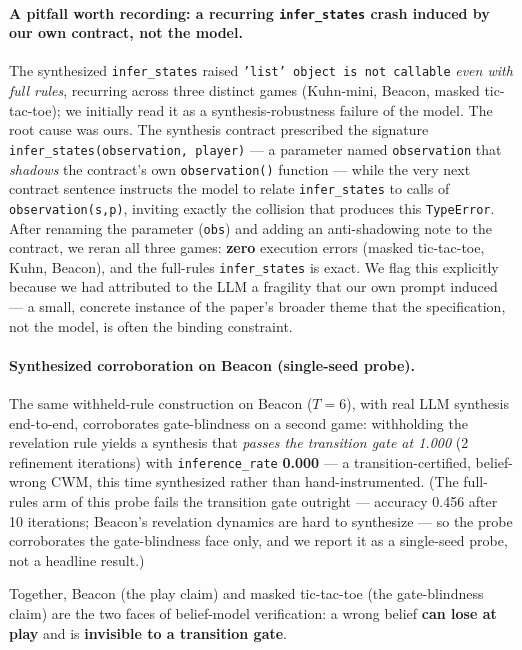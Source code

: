 \documentclass[11pt]{article}
\theoremstyle{remark}
\begin{document}
\paragraph{A pitfall worth recording: a recurring \texttt{infer\_states} crash induced by our own contract, not the model.} The synthesized \texttt{infer\_states} raised \texttt{'list' object is not callable} \emph{even with full rules}, recurring across three distinct games (Kuhn-mini, Beacon, masked tic-tac-toe); we initially read it as a synthesis-robustness failure of the model. The root cause was ours. The synthesis contract prescribed the signature \texttt{infer\_states(observation, player)} --- a parameter named \texttt{observation} that \emph{shadows} the contract's own \texttt{observation()} function --- while the very next contract sentence instructs the model to relate \texttt{infer\_states} to calls of \texttt{observation(s,p)}, inviting exactly the collision that produces this \texttt{TypeError}. After renaming the parameter (\texttt{obs}) and adding an anti-shadowing note to the contract, we reran all three games: \textbf{zero} execution errors (masked tic-tac-toe, Kuhn, Beacon), and the full-rules \texttt{infer\_states} is exact. We flag this explicitly because we had attributed to the LLM a fragility that our own prompt induced --- a small, concrete instance of the paper's broader theme that the specification, not the model, is often the binding constraint.

\paragraph{Synthesized corroboration on Beacon (single-seed probe).} The same withheld-rule construction on Beacon ($T=6$), with real LLM synthesis end-to-end, corroborates gate-blindness on a second game: withholding the revelation rule yields a synthesis that \emph{passes the transition gate at 1.000} (2 refinement iterations) with \texttt{inference\_rate} \textbf{0.000} --- a transition-certified, belief-wrong CWM, this time synthesized rather than hand-instrumented. (The full-rules arm of this probe fails the transition gate outright --- accuracy 0.456 after 10 iterations; Beacon's revelation dynamics are hard to synthesize --- so the probe corroborates the gate-blindness face only, and we report it as a single-seed probe, not a headline result.)

Together, Beacon (the play claim) and masked tic-tac-toe (the gate-blindness claim) are the two faces of belief-model verification: a wrong belief \textbf{can lose at play} and is \textbf{invisible to a transition gate}.
\end{document}
